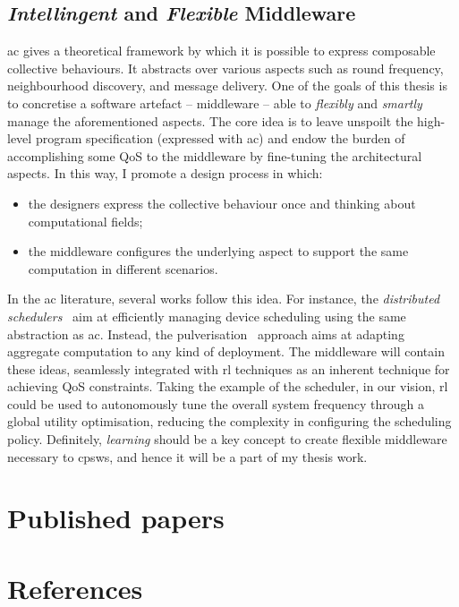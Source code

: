 \documentclass[11pt]{article}
\begin{document}
\subsection{\emph{Intellingent} and \emph{Flexible} Middleware}\label{middleware}
\ac{ac} gives a theoretical framework by which it is possible to express composable collective behaviours. It abstracts over various aspects such as round frequency, neighbourhood discovery, and message delivery.
One of the goals of this thesis is to concretise a software artefact -- middleware -- able to \emph{flexibly} and \emph{smartly} manage the aforementioned aspects.
%
The core idea is to leave unspoilt the high-level program specification (expressed with \ac{ac}) and endow the burden of accomplishing some QoS to the middleware by fine-tuning the architectural aspects. 
%
In this way, I promote a design process in which:
\begin{itemize}
	\item the designers express the collective behaviour once and thinking about computational fields;
	\item the middleware configures the underlying aspect to support the same computation in different scenarios.
\end{itemize}
%
In the \ac{ac} literature, several works follow this idea. 
%
For instance, the \emph{distributed schedulers}~\cite{DBLP:journals/corr/abs-2012-13806} aim at efficiently managing device scheduling using the same abstraction as \ac{ac}.
Instead, the pulverisation~\cite{DBLP:journals/fi/CasadeiPPVW20} approach aims at adapting aggregate computation to any kind of deployment.
%
The middleware will contain these ideas, seamlessly integrated with \ac{rl} techniques as an inherent technique for achieving  QoS constraints.
%
Taking the example of the scheduler, in our vision, \ac{rl} could be used to autonomously tune the overall system frequency through a global utility optimisation, reducing the complexity in configuring the scheduling policy.
%
Definitely, \emph{learning} should be a key concept to create flexible middleware necessary to \acp{cpsw}, and hence it will be a part of my thesis work. 
\nocite{collectiveautonomy}
\section{Published papers}
\printbibliography[heading=none, check=mine]
\section{References}
\printbibliography[heading=none, check=other]
\end{document}
